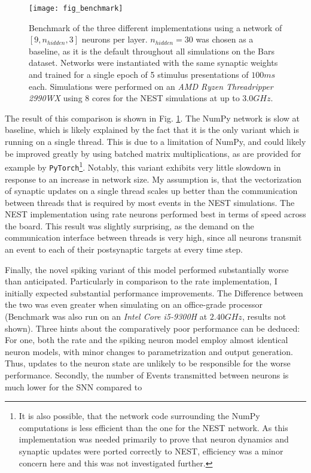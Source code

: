 \begin{figure}[t]
    \centering
    \texttt{[image: fig\_benchmark]}
    \caption{Benchmark of the three different implementations using a network of $[9, n_{hidden}, 3]$ neurons per layer.
        $n_{hidden}=30$ was chosen as a baseline, as it is the default throughout all simulations on the Bars dataset.
        Networks were instantiated with the same synaptic weights and trained for a single epoch of 5 stimulus
        presentations of $100ms$ each. Simulations were performed on an \textit{AMD Ryzen Threadripper 2990WX} using 8
        cores for the NEST simulations at up to $3.0GHz$.}
    \label{fig-benchmark}
\end{figure}

The result of this comparison is shown in Fig. \ref{fig-benchmark}. The NumPy network is slow at baseline, which is
likely explained by the fact that it is the only variant which is running on a single thread. This is due to a
limitation of NumPy, and could likely be improved greatly by using batched matrix multiplications, as are provided for
example by \texttt{PyTorch}\footnote{It is also possible, that the network code surrounding the NumPy computations is
less efficient than the one for the NEST network. As this implementation was needed primarily to prove that neuron
dynamics and synaptic updates were ported correctly to NEST, efficiency was a minor concern here and this was not
investigated further.}.  Notably, this variant exhibits very little slowdown in response to an increase in network size.
My assumption is, that the vectorization of synaptic updates on a single thread scales up better than the communication
between threads that is required by most events in the NEST simulations. The NEST implementation using rate neurons
performed best in terms of speed across the board. This result was slightly surprising, as the demand on the
communication interface between threads is very high, since all neurons transmit an event to each of their postsynaptic
targets at every time step.

Finally, the novel spiking variant of this model performed substantially worse than anticipated. Particularly in
comparison to the rate implementation, I initially expected substantial performance improvements. The Difference between
the two was even greater when simulating on an office-grade processor (Benchmark was also run on an \textit{Intel Core
i5-9300H} at $2.40GHz$, results not shown). Three hints about the comparatively poor performance can be deduced: For
one, both the rate and the spiking neuron model employ almost identical neuron models, with minor changes to
parametrization and output generation. Thus, updates to the neuron state are unlikely to be responsible for the worse
performance. Secondly, the number of Events transmitted between neurons is much lower for the SNN compared to

